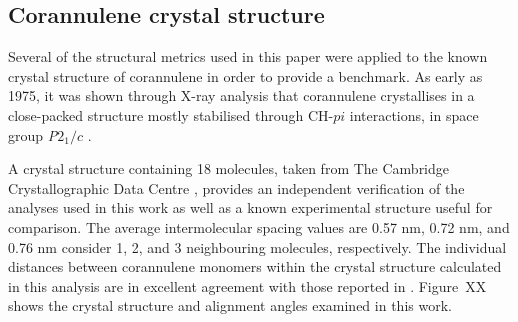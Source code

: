 

\subsection{Corannulene crystal structure}
\label{secSI:corannulenecrystal}
Several of the structural metrics used in this paper were applied to the known crystal structure of corannulene in order to provide a benchmark. 
As early as 1975, it was shown through X-ray analysis that corannulene crystallises in a close-packed structure mostly stabilised through CH-$pi$ interactions, in space group \textit{P}$2_{1}/c$ \cite{hanson1976crystal}.

A crystal structure containing 18 molecules, taken from The Cambridge Crystallographic Data Centre \cite{CORANN11unitcell}, provides an independent verification of the analyses used in this work as well as a known experimental structure useful for comparison. The average intermolecular spacing values are 0.57 nm, 0.72 nm, and 0.76 nm consider 1, 2, and 3 neighbouring molecules, respectively. The individual distances between corannulene monomers within the crystal structure calculated in this analysis are in excellent agreement with those reported in \citet{sanyal2014functional}. Figure~XX shows the crystal structure and alignment angles examined in this work.

